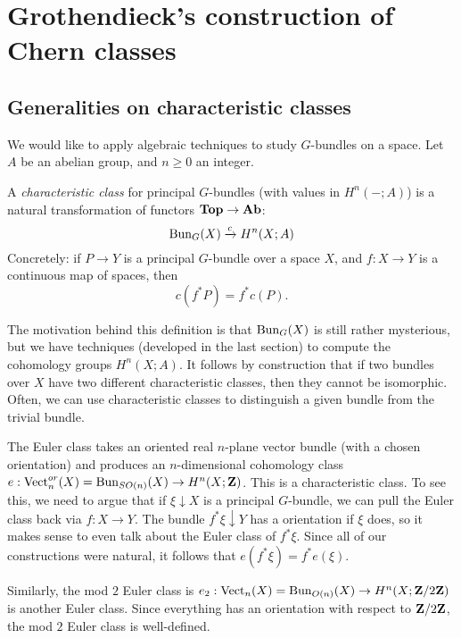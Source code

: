 \section{Grothendieck's construction of Chern classes}
\subsection{Generalities on characteristic classes}
We would like to apply algebraic techniques to study $G$-bundles on a space.
Let $A$ be an abelian group, and $n\geq 0$ an integer.
\begin{definition}
    A \emph{characteristic class} for principal $G$-bundles (with values in
    $H^n(-;A)$) is a natural transformation of functors $\mathbf{Top}\to \mathbf{Ab}$:
    $$\mathrm{Bun}_G(X) \xrightarrow{{c}} H^n(X;A)$$
    Concretely: if $P\to Y$ is a principal $G$-bundle over a space $X$, and
    $f:X\to Y$ is a continuous map of spaces, then
    $$c(f^\ast P) = f^\ast c(P).$$
\end{definition}
The motivation behind this definition is that $\mathrm{Bun}_G(X)$ is still rather
mysterious, but we have techniques (developed in the last section) to compute
the cohomology groups $H^n(X;A)$. It follows by construction that if two
bundles over $X$ have two different characteristic classes, then they cannot be
isomorphic. Often, we can use characteristic classes to distinguish a given
bundle from the trivial bundle.

\begin{example}
    The Euler class takes an oriented real $n$-plane vector bundle (with a
    chosen orientation) and produces an $n$-dimensional cohomology class
    $e:\operatorname{Vect}^{or}_n(X) = \mathrm{Bun}_{SO(n)}(X)\to H^n(X;\mathbf Z)$. This is a
    characteristic class. To see this, we need to argue that if $\xi\downarrow
    X$ is a principal $G$-bundle, we can pull the Euler class back via $f:X \to
    Y$. The bundle $f^\ast\xi\downarrow Y$ has a orientation if $\xi$ does, so
    it makes sense to even talk about the Euler class of $f^\ast\xi$. Since all
    of our constructions were natural, it follows that $e(f^\ast\xi) = f^\ast
    e(\xi)$.

    Similarly, the {mod $2$ Euler class} is $e_2:\operatorname{Vect}_n(X) = \mathrm{Bun}_{O(n)}(X)
    \to H^n(X;\mathbf Z/2\mathbf Z)$ is another Euler class. Since everything has an
    orientation with respect to $\mathbf Z/2\mathbf Z$, the mod $2$ Euler class is
    well-defined. 
\end{example}

